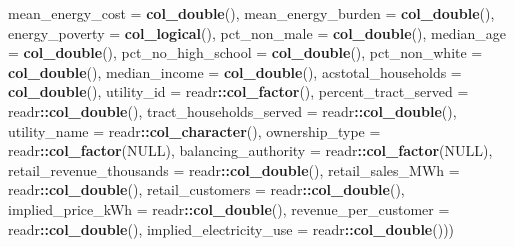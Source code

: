 \documentclass[]{article}
\newenvironment{Shaded}{\begin{snugshade}}{\end{snugshade}}
\newcommand{\DataTypeTok}[1]{\textcolor[rgb]{0.13,0.29,0.53}{#1}}
\newcommand{\KeywordTok}[1]{\textcolor[rgb]{0.13,0.29,0.53}{\textbf{#1}}}
\newcommand{\NormalTok}[1]{#1}
\newcommand{\OperatorTok}[1]{\textcolor[rgb]{0.81,0.36,0.00}{\textbf{#1}}}
\newcommand{\OtherTok}[1]{\textcolor[rgb]{0.56,0.35,0.01}{#1}}
\begin{document}
\begin{Shaded}
\begin{Highlighting}[]
                            \DataTypeTok{mean_energy_cost =} \KeywordTok{col_double}\NormalTok{(),}
                            \DataTypeTok{mean_energy_burden =} \KeywordTok{col_double}\NormalTok{(),}
                            \DataTypeTok{energy_poverty =} \KeywordTok{col_logical}\NormalTok{(),}
                            \DataTypeTok{pct_non_male =} \KeywordTok{col_double}\NormalTok{(), }
                            \DataTypeTok{median_age =} \KeywordTok{col_double}\NormalTok{(),}
                            \DataTypeTok{pct_no_high_school =} \KeywordTok{col_double}\NormalTok{(),}
                            \DataTypeTok{pct_non_white =} \KeywordTok{col_double}\NormalTok{(),}
                            \DataTypeTok{median_income =} \KeywordTok{col_double}\NormalTok{(),}
                            \DataTypeTok{acstotal_households =} \KeywordTok{col_double}\NormalTok{(),}
                            \DataTypeTok{utility_id =}\NormalTok{ readr}\OperatorTok{::}\KeywordTok{col_factor}\NormalTok{(),}
                            \DataTypeTok{percent_tract_served =}\NormalTok{ readr}\OperatorTok{::}\KeywordTok{col_double}\NormalTok{(),}
                            \DataTypeTok{tract_households_served =}\NormalTok{ readr}\OperatorTok{::}\KeywordTok{col_double}\NormalTok{(),}
                            \DataTypeTok{utility_name =}\NormalTok{ readr}\OperatorTok{::}\KeywordTok{col_character}\NormalTok{(),}
                            \DataTypeTok{ownership_type =}\NormalTok{ readr}\OperatorTok{::}\KeywordTok{col_factor}\NormalTok{(}\OtherTok{NULL}\NormalTok{),}
                            \DataTypeTok{balancing_authority =}\NormalTok{ readr}\OperatorTok{::}\KeywordTok{col_factor}\NormalTok{(}\OtherTok{NULL}\NormalTok{),}
                            \DataTypeTok{retail_revenue_thousands =}\NormalTok{ readr}\OperatorTok{::}\KeywordTok{col_double}\NormalTok{(),}
                            \DataTypeTok{retail_sales_MWh =}\NormalTok{ readr}\OperatorTok{::}\KeywordTok{col_double}\NormalTok{(),}
                            \DataTypeTok{retail_customers =}\NormalTok{ readr}\OperatorTok{::}\KeywordTok{col_double}\NormalTok{(),}
                            \DataTypeTok{implied_price_kWh =}\NormalTok{ readr}\OperatorTok{::}\KeywordTok{col_double}\NormalTok{(),}
                            \DataTypeTok{revenue_per_customer =}\NormalTok{ readr}\OperatorTok{::}\KeywordTok{col_double}\NormalTok{(),}
                            \DataTypeTok{implied_electricity_use =}\NormalTok{ readr}\OperatorTok{::}\KeywordTok{col_double}\NormalTok{()))}
\end{Highlighting}
\end{Shaded}
\end{document}
